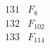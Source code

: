 \documentclass{article}
\begin{document}
{$$\begin{array}{|r|*{7}{r|}}
\\
\hline
131 
 & F_{8} &
 & 
 & 
 & 
 & 
 & 
\\
\hline
132 
 & F_{102} &
 & 
 & 
 & 
 & 
 & 
\\
\hline
133 
 & F_{114} &
 & 
 & 
 & 

\end{array}$$}
\end{document}
